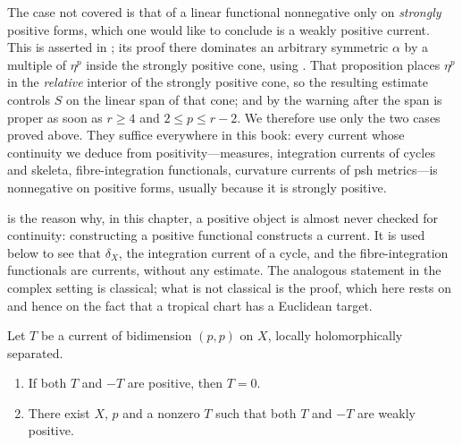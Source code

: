 \begin{remark}
\label{rem:ch14-third-case}
The case not covered is that of a linear functional nonnegative only on
\emph{strongly} positive forms, which one would like to conclude is a weakly
positive current.  This is asserted in \cite[Proposition~7.2.9]{CLD25}; its
proof there dominates an arbitrary symmetric $\alpha$ by a multiple of
$\eta^p$ inside the strongly positive cone, using
\cite[Proposition~1.2.13]{CLD25}.  That proposition places $\eta^p$ in the
\emph{relative} interior of the strongly positive cone, so the resulting
estimate controls $S$ on the linear span of that cone; and by the warning
after  the span is proper as soon as $r\ge4$ and
$2\le p\le r-2$.  We therefore use only the two cases proved above.  They
suffice everywhere in this book: every current whose continuity we deduce
from positivity---measures, integration currents of cycles and skeleta,
fibre-integration functionals, curvature currents of psh
metrics---is nonnegative on positive forms, usually because it is strongly
positive.
\end{remark}

\begin{remark}
\label{rem:ch14-positivity-gives-continuity}
 is the reason why, in this chapter, a
positive object is almost never checked for continuity: constructing a
positive functional constructs a current.  It is used below to see that
$\delta_X$, the integration current of a cycle, and the fibre-integration
functionals are currents, without any estimate.  The analogous statement in
the complex setting is classical; what is not classical is the proof, which
here rests on  and hence on the fact that a
tropical chart has a Euclidean target.
\end{remark}

\begin{proposition}
\label{prop:ch14-positive-and-negative}
Let $T$ be a current of bidimension $(p,p)$ on $X$, locally holomorphically
separated.
\begin{enumerate}
\item If both $T$ and $-T$ are positive, then $T=0$.
\item There exist $X$, $p$ and a nonzero $T$ such that both $T$ and $-T$ are
  weakly positive.
\end{enumerate}
\end{proposition}

